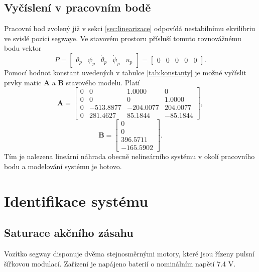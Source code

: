 \documentclass[conference]{IEEEtran}
\begin{document}
\subsection{Vyčíslení v pracovním bodě}

Pracovní bod zvolený již v sekci \ref{sec:linearizace} odpovídá nestabilnímu ekvilibriu ve svislé pozici segwaye.
Ve stavovém prostoru přísluší tomuto rovnovážnému bodu vektor 
\begin{equation}
    P = \begin{bmatrix}
        \theta_p &    \psi_p &     \dot{\theta}_p &     \dot{\psi}_p & u_p
    \end{bmatrix} = \begin{bmatrix}
        0 & 0 & 0 & 0 & 0
    \end{bmatrix}.
    \label{eq:prac_bod}
\end{equation}
Pomocí hodnot konstant uvedených v tabulce \ref{tab:konstanty} je možné vyčíslit prvky matic $\mathbf{A}$ a $\mathbf{B}$ stavového modelu. Platí
\begin{equation}
        \mathbf{A} = \begin{bmatrix}
            0 &        0 &    1.0000 &        0 \\
            0 &        0 &         0 &   1.0000 \\
            0 &-513.8877 & -204.0077 & 204.0077 \\
            0 & 281.4627 &   85.1844 & -85.1844
        \end{bmatrix},
    \end{equation}
    \begin{equation}
        \mathbf{B} = \begin{bmatrix}
            0 \\ 0 \\   396.5711 \\-165.5902
        \end{bmatrix}.
        \label{eq:matice_linearizovane}
    \end{equation}
Tím je nalezena lineární náhrada obecně nelineárního systému v okolí pracovního bodu a modelování systému je hotovo.

\section{Identifikace systému}

\subsection{Saturace akčního zásahu}
\label{sec:ubat}
Vozítko segway disponuje dvěma stejnosměrnými motory, které jsou řízeny pulsní šířkovou
modulací. Zařízení je napájeno baterií o nominálním napětí 7.4 \si{V}.
\end{document}
